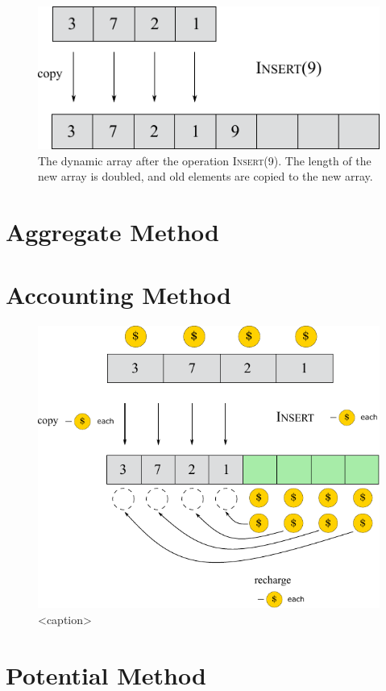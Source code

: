 \begin{figure}[htbp]
    \includegraphics[width=0.4\linewidth]{figures/dynamic_arr_append.pdf}

    \hfill

    \caption[width=0.5\linewidth]{The dynamic array after the operation \textsc{Insert}(9). The length of the new array is doubled, and old elements are copied to the new array.}
\end{figure}

\section{Aggregate Method}

\section{Accounting Method}

\begin{figure}[htbp]
    \centering
    \includegraphics[width=0.6\linewidth]{figures/accounting_method_insert.pdf}
    \caption{<caption>}
\end{figure}

\section{Potential Method}

\vspace{\parskip}

